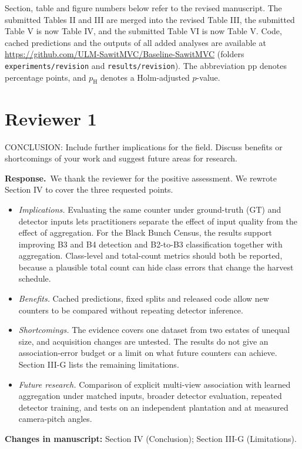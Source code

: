 \documentclass[10pt,a4paper]{article}
\newcommand{\resp}{\textbf{Response.}\ }
\newcommand{\changes}[1]{\par\textbf{Changes in manuscript:} #1}
\newcommand{\pH}{p_{\mathrm{H}}}
\begin{document}
Section, table and figure numbers below refer to the revised manuscript. The submitted
Tables II and III are merged into the revised Table III, the submitted Table V is now
Table IV, and the submitted Table VI is now Table V. Code, cached predictions and the
outputs of all added analyses are available at
\url{https://github.com/ULM-SawitMVC/Baseline-SawitMVC} (folders
\texttt{experiments/revision} and \texttt{results/revision}).
The abbreviation pp denotes percentage points, and $\pH$ denotes a Holm-adjusted
$p$-value.

\section{Reviewer 1}

\begin{cmt}
CONCLUSION: Include further implications for the field. Discuss benefits or
shortcomings of your work and suggest future areas for research.
\end{cmt}
\resp We thank the reviewer for the positive assessment. We rewrote Section IV to cover
the three requested points.
\begin{itemize}
\item \emph{Implications.} Evaluating the same counter under ground-truth (GT) and
  detector inputs lets practitioners separate the effect of input quality from the
  effect of aggregation. For the Black Bunch Census, the results support improving B3
  and B4 detection and B2-to-B3 classification together with aggregation. Class-level
  and total-count metrics should both be reported, because a plausible total count can
  hide class errors that change the harvest schedule.
\item \emph{Benefits.} Cached predictions, fixed splits and released code allow new
  counters to be compared without repeating detector inference.
\item \emph{Shortcomings.} The evidence covers one dataset from two estates of unequal
  size, and acquisition changes are untested. The results do not give an
  association-error budget or a limit on what future counters can achieve.
  Section III-G lists the remaining limitations.
\item \emph{Future research.} Comparison of explicit multi-view association with learned
  aggregation under matched inputs, broader detector evaluation, repeated detector
  training, and tests on an independent plantation and at measured camera-pitch angles.
\end{itemize}
\changes{Section IV (Conclusion); Section III-G (Limitations).}
\end{document}
